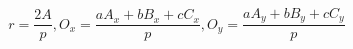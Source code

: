 \documentclass[12pt]{article}
\begin{document}
\[
    r = \frac{2A}{p}, O_x = \frac{aA_x + bB_x + cC_x}{p}, O_y = \frac{aA_y + bB_y + cC_y}{p} 
\]
\end{document}
